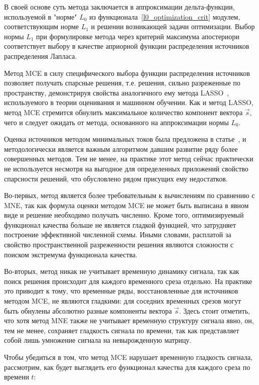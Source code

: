 В своей основе суть метода заключается в аппроксимации дельта-функции,
используемой в "норме" $L_0$ из функционала~\ref{l0_optimization_crit} модулем,
соответствующим норме $L_1$ и решении возникающей задачи оптимизации. Выбор
нормы $L_1$ при формулировке метода через критерий максимума апостериори
соответствует выбору в качестве априорной функции распределения источников
распределения Лапласа.


Метод MCE в силу специфического выбора функции распределения источников
позволяет получать спарсные решения, т.е. решения, сильно разреженные по
пространству, демонстрируя свойства аналогичного ему метода
LASSO~\cite{lasso_paper}, используемого в теории оценивания и машинном обучении.
Как и метод LASSO, метод MCE стремится обнулить максимальное количество
компонент вектора $\vec{s}$, чего и следует ожидать от метода, основанного
на аппроксимации нормы $L_0$.

Оценка источников методом минимальных токов была
предложена в статье~\cite{Uutela_MCE}, и методологически является важным алгоритмом
давшим развитие ряду более совершенных методов. Тем не менее, на практике этот
метод сейчас практически не используется несмотря на выгодное для определенных
приложений свойство спарсности решений, что обусловлено рядом присущих ему
недостатков.

Во-первых, метод является более требовательным к вычислениям по сравнению с
MNE, так как формула оценки методом MCE не может быть выписана в явном виде и
решение необходимо получать численно. Кроме того, оптимизируемый функционал
качества больше не является гладкой функцией, что затрудняет построение
эффективной численной схемы.  Иными словами, расплатой за свойство
пространственной разреженности решения являются сложности с поиском экстремума
функционала качества.

Во-вторых, метод никак не учитывает временную динамику сигнала, так как поиск
решения происходит для каждого временного среза отдельно.  На практике это
приводит к тому, что временные ряды, восстановленные для источников методом
MCE, не являются гладкими: для соседних временных срезов могут быть обнулены
абсолютно разные компоненты вектора $\vec{s}$. Здесь стоит отметить, что
хотя метод MNE также не учитывает временную структуру сигнала явно, он, тем не
менее, сохраняет гладкость сигнала по времени, так как представляет собой
лишь умножение сигнала на невырожденную матрицу.

Чтобы убедиться в том, что метод MCE нарушает временную гладкость сигнала,
рассмотрим, как будет выглядеть его функционал качества для каждого среза по
времени $t$:

